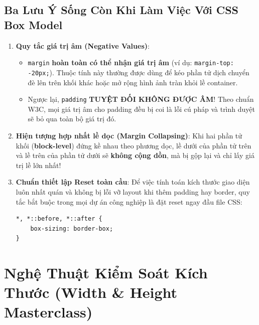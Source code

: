 \documentclass[11pt,oneside]{book}
\newcommand{\codeinline}[1]{\textcolor{accentOrange}{\texttt{#1}}}
\newcommand{\term}[1]{\textbf{\textcolor{primaryBlue}{#1}}}
\begin{document}
\section{Ba Lưu Ý Sống Còn Khi Làm Việc Với CSS Box Model}
\label{sec:box_model_vital_notes}

\begin{warnBox}
\begin{enumerate}[leftmargin=1.5em, itemsep=4pt, parsep=0pt]
    \item \textbf{Quy tắc giá trị âm (Negative Values)}:
    \begin{itemize}[leftmargin=1.2em, itemsep=2pt, parsep=0pt]
        \item \codeinline{margin} \textbf{hoàn toàn có thể nhận giá trị âm} (ví dụ: \codeinline{margin-top: -20px;}). Thuộc tính này thường được dùng để kéo phần tử dịch chuyển đè lên trên khối khác hoặc mở rộng hình ảnh tràn khỏi lề container.
        \item Ngược lại, \codeinline{padding} \textbf{TUYỆT ĐỐI KHÔNG ĐƯỢC ÂM}! Theo chuẩn W3C, mọi giá trị âm cho padding đều bị coi là lỗi cú pháp và trình duyệt sẽ bỏ qua toàn bộ giá trị đó.
    \end{itemize}
    \item \textbf{Hiện tượng hợp nhất lề dọc (Margin Collapsing)}: Khi hai phần tử khối (\term{block-level}) đứng kề nhau theo phương dọc, lề dưới của phần tử trên và lề trên của phần tử dưới sẽ \textbf{không cộng dồn}, mà bị gộp lại và chỉ lấy giá trị lề lớn nhất!
    \item \textbf{Chuẩn thiết lập Reset toàn cầu}: Để việc tính toán kích thước giao diện luôn nhất quán và không bị lỗi vỡ layout khi thêm padding hay border, quy tắc bắt buộc trong mọi dự án công nghiệp là đặt reset ngay đầu file CSS:
\begin{lstlisting}[language=CSS3]
*, *::before, *::after {
    box-sizing: border-box;
}
\end{lstlisting}
\end{enumerate}
\end{warnBox}

\clearpage

\chapter{Nghệ Thuật Kiểm Soát Kích Thước (Width \& Height Masterclass)}
\label{chap:width_height_masterclass}
\end{document}
